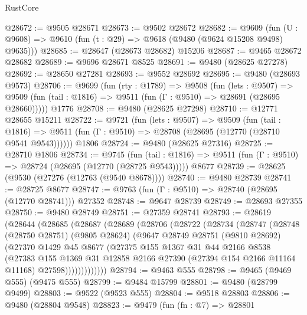 \begin{lexlean}{RustCore}
\begin{coremodule}
@28672 := @9505 @28671
@28673 := @9502 @28672
@28682 := @9609
    (fun (U : @9608) => @9610 (fun (t : @29) => @9618 (@9480 (@9624 @15208 @9498) @9635)))
@28685 := @28647 (@28673 @28682) @15206
@28687 := @9465 @28672 @28682
@28689 := @9696 @28671 @8525
@28691 := @9480 (@28625 @27278)
@28692 := @28650 @27281
@28693 := @9552 @28692
@28695 := @9480 (@28693 @9573)
@28706 := @9699
    (fun (rty : @1789) =>
    @9508
      (fun (lets : @9507) =>
      @9509 (fun (tail : @1816) => @9511 (fun (Γ : @9510) => @28691 (@28695 @28660)))))
    @1776
@28708 := @9480 (@28625 @27298)
@28710 := @12771 @28655 @15211
@28722 := @9721
    (fun (lets : @9507) =>
    @9509
      (fun (tail : @1816) =>
      @9511 (fun (Γ : @9510) => @28708 (@28695 (@12770 (@28710 @9541 @9543))))))
    @1806
@28724 := @9480 (@28625 @27316)
@28725 := @28710 @1806
@28734 := @9745
    (fun (tail : @1816) => @9511 (fun (Γ : @9510) => @28724 (@28695 (@12770 (@28725 @9543)))))
    @8677
@28739 := @28625 (@9530 (@27276 (@12763 (@9540 @8678))))
@28740 := @9480 @28739
@28741 := @28725 @8677
@28747 := @9763 (fun (Γ : @9510) => @28740 (@28695 (@12770 @28741))) @27352
@28748 := @9647 @28739
@28749 := @28693 @27355
@28750 := @9480 @28749
@28751 := @27359 @28741
@28793 := @28619
    (@28644
      (@28685
        (@28687
          (@28689
            (@28706
              (@28722
                (@28734
                  (@28747
                    (@28748
                      (@28750 @28751)
                      (@9805 @28624)
                      (@9647
                        @28749
                        @28751
                        (@9810 @28692)
                        (@27370
                          @1429
                          @45
                          @8677
                          (@27375
                            @155
                            @1367
                            @31
                            @44
                            @2166
                            @8538
                            (@27383
                              @155
                              @1369
                              @31
                              @12858
                              @2166
                              @27390
                              (@27394 @154 @2166 @11164 @11168)
                              @27598)))))))))))))
@28794 := @9463 @555
@28798 := @9465 (@9469 @555) (@9475 @555)
@28799 := @9484 @15799
@28801 := @9480 (@28799 @9499)
@28803 := @9522 (@9523 @555)
@28804 := @9518 @28803
@28806 := @9480 (@28804 @9548)
@28823 := @9479
    (fun (fn : @7) =>
    @28801

\end{coremodule}
\end{lexlean}
